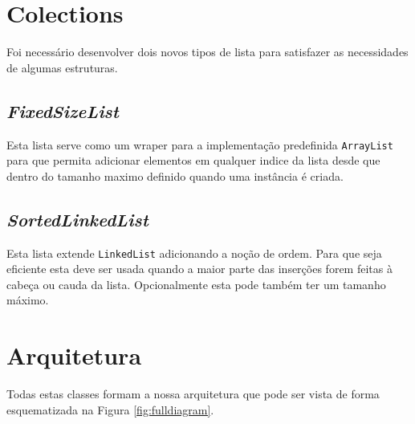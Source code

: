 \documentclass[10pt,a4paper]{report}
\begin{document}
    \section{Colections}
    Foi necessário desenvolver dois novos tipos de lista para satisfazer as
    necessidades de algumas estruturas.

        \subsection{\textit{FixedSizeList}}
        Esta lista serve como um wraper para a implementação predefinida
        \texttt{ArrayList} para que permita adicionar elementos
        em qualquer indice da lista desde que dentro do tamanho maximo definido
        quando uma instância é criada.

        \subsection{\textit{SortedLinkedList}}
        Esta lista extende \texttt{LinkedList} adicionando a noção de
        ordem. Para que seja eficiente esta deve ser usada quando a maior parte
        das inserções forem feitas à cabeça ou cauda da lista. Opcionalmente
        esta pode também ter um tamanho máximo.

    \section{Arquitetura}
    Todas estas classes formam a nossa arquitetura que pode ser vista de forma
    esquematizada na Figura \ref{fig:fulldiagram}.
\end{document}
